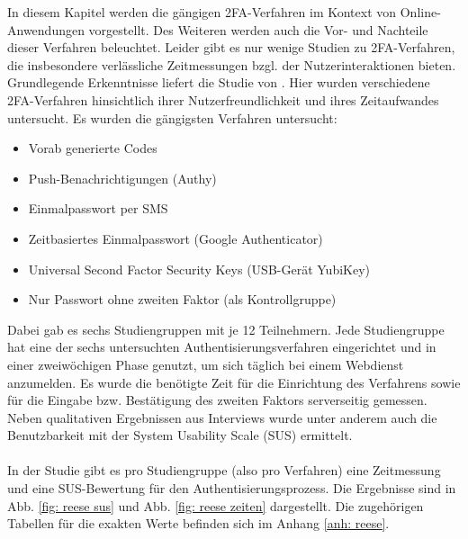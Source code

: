 In diesem Kapitel werden die gängigen 2FA-Verfahren im Kontext von 
Online-Anwendungen vorgestellt. Des Weiteren werden auch die Vor- und Nachteile dieser Verfahren beleuchtet. 
Leider gibt es nur wenige Studien zu 2FA-Verfahren, die insbesondere verlässliche 
Zeitmessungen bzgl. der Nutzerinteraktionen bieten. Grundlegende Erkenntnisse liefert die Studie 
von \textcite{Reese}. Hier wurden verschiedene 
2FA-Verfahren hinsichtlich ihrer Nutzerfreundlichkeit und ihres Zeitaufwandes 
untersucht. Es wurden die gängigsten Verfahren untersucht:
\begin{itemize}
    \item Vorab generierte Codes
    \item Push-Benachrichtigungen (Authy)
    \item Einmalpasswort per SMS
    \item Zeitbasiertes Einmalpasswort (Google Authenticator)
    \item Universal Second Factor Security Keys (USB-Gerät YubiKey)
    \item Nur Passwort ohne zweiten Faktor (als Kontrollgruppe)
\end{itemize}
Dabei gab es sechs Studiengruppen mit je 12 Teilnehmern. Jede Studiengruppe hat eine 
der sechs untersuchten Authentisierungsverfahren eingerichtet und in einer 
zweiwöchigen Phase genutzt, um sich täglich bei einem Webdienst anzumelden. Es 
wurde die benötigte Zeit für die Einrichtung des Verfahrens sowie für die Eingabe bzw. 
Bestätigung des zweiten Faktors serverseitig gemessen. 
Neben qualitativen Ergebnissen aus Interviews wurde unter anderem auch die Benutzbarkeit mit der System 
Usability Scale (SUS) ermittelt.
\\\\
In der Studie gibt es pro Studiengruppe (also pro Verfahren) eine Zeitmessung und 
eine SUS-Bewertung für den Authentisierungsprozess. Die Ergebnisse sind in Abb. \ref{fig: reese sus} und Abb. \ref{fig: reese zeiten} dargestellt. Die zugehörigen Tabellen für die exakten Werte befinden sich im Anhang \ref{anh: reese}.
\\
